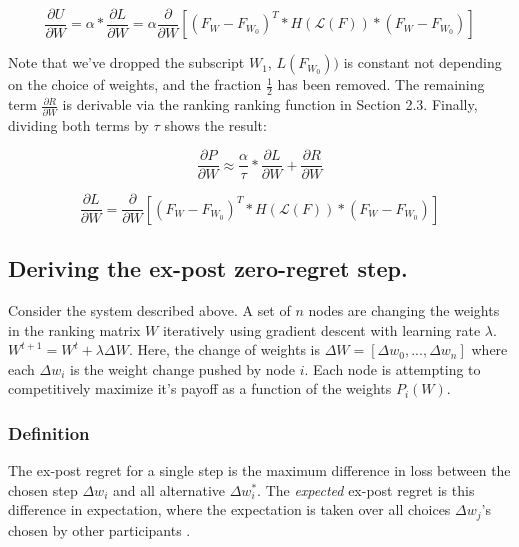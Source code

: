 \documentclass{article}
\begin{document}
\begin{equation}
\frac{\partial U}{\partial W} = \alpha * \frac{\partial L}{\partial W} = \alpha \frac{\partial}{\partial W} [(F_W - F_{W_0})^T * H( \mathcal{L}(F)) * (F_W - F_{W_0}) ]
\end{equation}

Note that we've dropped the subscript $W_1$,  $L(F_{W_0}))$ is constant not depending on the choice of weights, and the fraction $\frac{1}{2}$ has been removed. The remaining term $\frac{\partial R}{\partial W}$ is derivable via the ranking ranking function in Section 2.3.  Finally, dividing both terms by $\tau$ shows the result:

\begin{equation}
\frac{\partial P}{\partial W} \approx \frac{\alpha}{\tau} * \frac{\partial L}{\partial W} + \frac{\partial R}{\partial W}
\end{equation}

\begin{equation}
\frac{\partial L}{\partial W} = \frac{\partial}{\partial W} [(F_W - F_{W_0})^T * H( \mathcal{L}(F)) * (F_W - F_{W_0})] 
\end{equation}
\smallskip


\subsection{Deriving the ex-post zero-regret step.}

Consider the system described above. A set of $n$ nodes are changing the weights in the ranking matrix $W$ iteratively using gradient descent with learning rate $\lambda$. $W^{t+1} = W^t + \lambda \Delta W$. Here, the change of weights is $\Delta W = [\Delta w_0, ... , \Delta w_n]$ where each $\Delta w_i$ is the weight change pushed by node $i$. Each node is attempting to competitively maximize it's payoff as a function of the weights $P_i(W)$.
\smallskip


\subsubsection{Definition}

The ex-post regret for a single step is the maximum difference in loss between the chosen step $\Delta w_i$ and all alternative $\Delta w_i^*$. The \textit{expected} ex-post regret is this difference in expectation, where the expectation is taken over all choices $\Delta w_j$'s chosen by other participants \cite{dtting2017optimal}.
\smallskip
\end{document}
